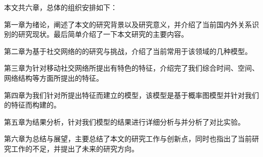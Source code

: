 本文共六章，总体的组织安排如下：

第一章为绪论，阐述了本文的研究背景以及研究意义，并介绍了当前国内外关系识别的研究现状。最后简单介绍了一下本文研究的主要内容。

第二章为基于社交网络的的研究与挑战，介绍了当前常用于该领域的几种模型。

第三章为针对移动社交网络所提出有特色的特征，介绍完了我们综合时间、空间、网络结构等方面所提出的特征。

第四章为我们针对所提出特征而建立的模型，该模型是基于概率图模型并针对我们的特征而构建的。

第五章为结果分析，针对我们模型的结果进行详细分析与并分析了对比实验。

第六章为总结与展望，主要总结了本文的研究工作与创新点，同时也指出了当前研究工作的不足，并提出了未来的研究方向。











